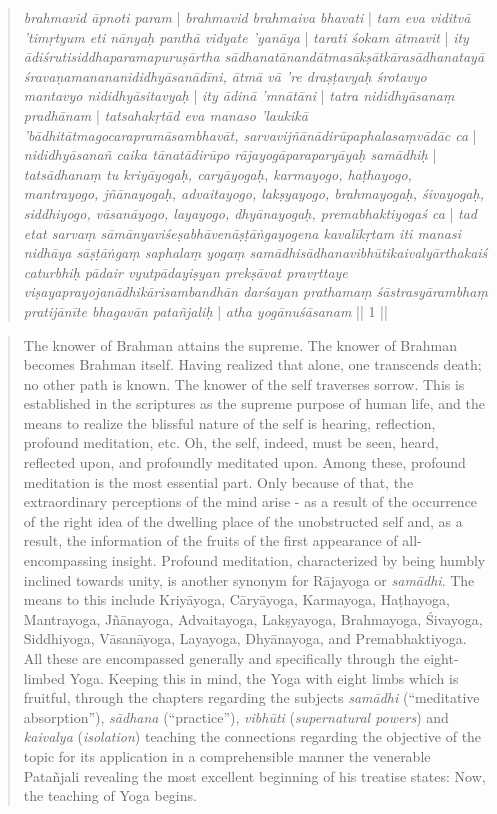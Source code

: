 \begin{quote}
\textit{brahmavid āpnoti param} | \textit{brahmavid brahmaiva bhavati} | \textit{tam eva viditvā 'timṛtyum eti nānyaḥ panthā vidyate 'yanāya} | \textit{tarati śokam ātmavit} | \textit{ity ādiśrutisiddhaparamapuruṣārtha sādhanatānandātmasākṣātkārasādhanatayā śravaṇamanananididhyāsanādīni, ātmā vā 're draṣṭavyaḥ śrotavyo mantavyo nididhyāsitavyaḥ} | \textit{ity ādinā 'mnātāni} | \textit{tatra nididhyāsanaṃ pradhānam} | \textit{tatsahakṛtād eva manaso 'laukikā 'bādhitātmagocarapramāsambhavāt, sarvavijñānādirūpaphalasaṃvādāc ca} | \textit{nididhyāsanañ caika tānatādirūpo rājayogāparaparyāyaḥ samādhiḥ} | \textit{tatsādhanaṃ tu kriyāyogaḥ, caryāyogaḥ, karmayogo, haṭhayogo, mantrayogo, jñānayogaḥ, advaitayogo, lakṣyayogo, brahmayogaḥ, śivayogaḥ, siddhiyogo, vāsanāyogo, layayogo, dhyānayogaḥ, premabhaktiyogaś ca} | \textit{tad etat sarvaṃ sāmānyaviśeṣabhāvenāṣṭāṅgayogena kavalīkṛtam iti manasi nidhāya sāṣṭāṅgaṃ saphalaṃ yogaṃ samādhisādhanavibhūtikaivalyārthakaiś caturbhiḥ pādair vyutpādayiṣyan prekṣāvat pravṛttaye viṣayaprayojanādhikārisambandhān darśayan prathamaṃ śāstrasyārambhaṃ pratijānīte bhagavān patañjaliḥ} | \textit{atha yogānuśāsanam} || 1 ||
  
\end{quote}
\begin{quote}
  The knower of Brahman attains the supreme. The knower of Brahman becomes Brahman itself. Having realized that alone, one transcends death; no other path is known. The knower of the self traverses sorrow. This is established in the scriptures as the supreme purpose of human life, and the means to realize the blissful nature of the self is hearing, reflection, profound meditation, etc. Oh, the self, indeed, must be seen, heard, reflected upon, and profoundly meditated upon. Among these, profound meditation is the most essential part. Only because of that, the extraordinary perceptions of the mind arise - as a result of the occurrence of the right idea of the dwelling place of the unobstructed self and, as a result, the information of the fruits of the first appearance of all-encompassing insight. Profound meditation, characterized by being humbly inclined towards unity, is another synonym for Rājayoga or \textit{samādhi}. The means to this include Kriyāyoga, Cāryāyoga, Karmayoga, Haṭhayoga, Mantrayoga, Jñānayoga, Advaitayoga, Lakṣyayoga, Brahmayoga, Śivayoga, Siddhiyoga, Vāsanāyoga, Layayoga, Dhyānayoga, and Premabhaktiyoga. All these are encompassed generally and specifically through the eight-limbed Yoga. Keeping this in mind, the Yoga with eight limbs which is fruitful, through the chapters regarding the subjects \textit{samādhi} (``meditative absorption''), \textit{sādhana} (``practice''), \textit{vibhūti} (\textit{supernatural powers}) and \textit{kaivalya} (\textit{isolation}) teaching the connections regarding the objective of the topic for its application in a comprehensible manner the venerable Patañjali revealing the most excellent beginning of his treatise states: Now, the teaching of Yoga begins.
  \end{quote}

